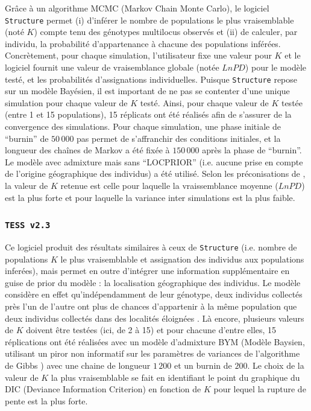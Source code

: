 \documentclass[a4paper,12pt,twoside]{article}\usepackage[]{graphicx}\usepackage[]{color}
\begin{document}
Grâce à un algorithme MCMC (Markov Chain Monte Carlo), le logiciel \texttt{Structure} permet (i) d'inférer le nombre de populations le plus vraisemblable (noté $K$) compte tenu des génotypes multilocus observés et (ii) de calculer, par individu, la probabilité d'appartenance à chacune des populations inférées. Concrètement, pour chaque simulation, l'utilisateur fixe une valeur pour $K$ et le logiciel fournit une valeur de vraisemblance globale (notée $LnPD$) pour le modèle testé, et les probabilités d'assignations individuelles. Puisque \texttt{Structure} repose sur un modèle Bayésien, il est important de ne pas se contenter d'une unique simulation pour chaque valeur de $K$ testé. Ainsi, pour chaque valeur de $K$ testée (entre 1 et 15 populations), 15 réplicats ont été réalisés afin de s'assurer de la convergence des simulations. Pour chaque simulation, une phase initiale de ``burnin'' de $50\,000$ pas permet de s'affranchir des conditions initiales, et la longueur des chaînes de Markov a été fixée à $150\,000$ après la phase de ``burnin''. Le modèle avec admixture mais sans ``LOCPRIOR'' (i.e. aucune prise en compte de l'origine géographique des individus) a été utilisé. Selon les préconisations de \citet{pritchard2000}, la valeur de $K$ retenue est celle pour laquelle la vraissemblance moyenne ($LnPD$) est la plus forte et pour laquelle la variance inter simulations est la plus faible.

\subsubsection*{\texttt{TESS~v2.3} \citep{durand2009}}

Ce logiciel produit des résultats similaires à ceux de \texttt{Structure} (i.e. nombre de populations $K$ le plus vraisemblable et assignation des individus aux populations inferées), mais permet en outre d'intégrer une information supplémentaire en guise de prior du modèle : la localisation géographique des individus. Le modèle considère en effet qu'indépendamment de leur génotype, deux individus collectés près l'un de l'autre ont plus de chances d'appartenir à la même population que deux individus collectés dans des localités éloignées \citep{durand2009}. Là encore, plusieurs valeurs de $K$ doivent être testées (ici, de 2 à 15) et pour chacune d'entre elles, 15 réplications ont été réalisées avec un modèle d'admixture BYM (Modèle Baysien, utilisant un piror non informatif sur les paramètres de variances de l'algorithme de Gibbs \cite{durand2009}) avec une chaine de longueur $1\,200$ et un burnin de $200$. Le choix de la valeur de $K$ la plus vraisemblable se fait en identifiant le point du graphique du DIC (Deviance Information Criterion) en fonction de $K$ pour lequel la rupture de pente est la plus forte.
\end{document}

